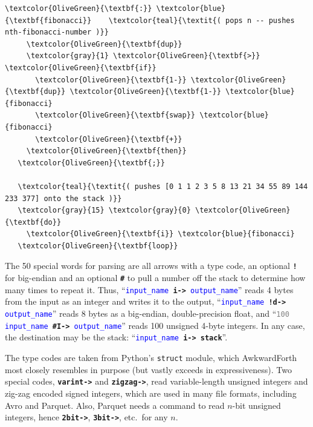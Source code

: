 \documentclass{webofc}
\begin{document}
\small
\begin{Verbatim}[commandchars=\\\{\}]
   \textcolor{OliveGreen}{\textbf{:}} \textcolor{blue}{\textbf{fibonacci}}    \textcolor{teal}{\textit{( pops n -- pushes nth-fibonacci-number )}}
     \textcolor{OliveGreen}{\textbf{dup}}
     \textcolor{gray}{1} \textcolor{OliveGreen}{\textbf{>}} \textcolor{OliveGreen}{\textbf{if}}
       \textcolor{OliveGreen}{\textbf{1-}} \textcolor{OliveGreen}{\textbf{dup}} \textcolor{OliveGreen}{\textbf{1-}} \textcolor{blue}{fibonacci}
       \textcolor{OliveGreen}{\textbf{swap}} \textcolor{blue}{fibonacci}
       \textcolor{OliveGreen}{\textbf{+}}
     \textcolor{OliveGreen}{\textbf{then}}
   \textcolor{OliveGreen}{\textbf{;}}

   \textcolor{teal}{\textit{( pushes [0 1 1 2 3 5 8 13 21 34 55 89 144 233 377] onto the stack )}}
   \textcolor{gray}{15} \textcolor{gray}{0} \textcolor{OliveGreen}{\textbf{do}}
     \textcolor{OliveGreen}{\textbf{i}} \textcolor{blue}{fibonacci}
   \textcolor{OliveGreen}{\textbf{loop}}
\end{Verbatim}
\normalsize

The 50 special words for parsing are all arrows with a type code, an optional \textcolor{OliveGreen}{\tt\textbf{!}} for big-endian and an optional \textcolor{OliveGreen}{\tt\textbf{\#}} to pull a number off the stack to determine how many times to repeat it. Thus, ``{\tt \textcolor{blue}{input\_name} \textcolor{OliveGreen}{\textbf{i->}} \textcolor{blue}{output\_name}}'' reads 4 bytes from the input as an integer and writes it to the output, ``{\tt \textcolor{blue}{input\_name} \textcolor{OliveGreen}{\textbf{!d->}} \textcolor{blue}{output\_name}}'' reads 8 bytes as a big-endian, double-precision float, and ``{\tt \textcolor{gray}{100} \textcolor{blue}{input\_name} \textcolor{OliveGreen}{\textbf{\#I->}} \textcolor{blue}{output\_name}}'' reads 100 unsigned 4-byte integers. In any case, the destination may be the stack: ``{\tt \textcolor{blue}{input\_name} \textcolor{OliveGreen}{\textbf{i->}} \textcolor{OliveGreen}{\textbf{stack}}}''.

The type codes are taken from Python's {\tt struct} module, which AwkwardForth most closely resembles in purpose (but vastly exceeds in expressiveness). Two special codes, \textcolor{OliveGreen}{\tt\textbf{varint->}} and \textcolor{OliveGreen}{\tt\textbf{zigzag->}}, read variable-length unsigned integers and zig-zag encoded signed integers, which are used in many file formats, including Avro and Parquet. Also, Parquet needs a command to read $n$-bit unsigned integers, hence \textcolor{OliveGreen}{\tt\textbf{2bit->}}, \textcolor{OliveGreen}{\tt\textbf{3bit->}}, etc.\ for any $n$.
\end{document}
